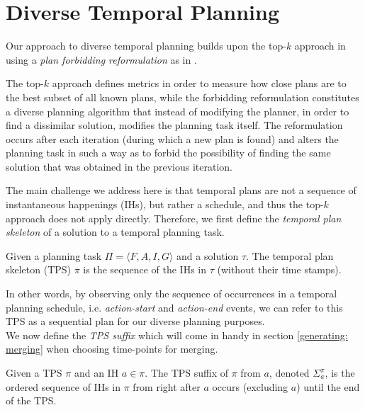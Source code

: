 \section{Diverse Temporal Planning}
\label{background: Diverse Temporal}

Our approach to diverse temporal planning builds upon the top-$k$ approach in \cite{katz2019reshaping} using a {\em plan forbidding reformulation} as in \cite{katz2018novel} . 

The top-$k$ approach defines metrics in order to measure how close plans are to the best subset of all known plans, while the forbidding reformulation constitutes a diverse planning algorithm that instead of modifying the planner, in order to find a dissimilar solution, modifies the planning task itself. The reformulation occurs after each iteration (during which a new plan is found) and alters the planning task in such a way as to forbid the possibility of finding the same solution that was obtained in the previous iteration.

The main challenge we address here is that temporal plans are not a sequence of instantaneous happenings (IHs), but rather a schedule, and thus the top-$k$ approach does not apply directly. Therefore, we first define the {\em temporal plan skeleton} of a solution to a temporal planning task.

\begin{definition}
Given a planning task $\Pi = \langle F,A,I,G \rangle$ and a solution $\tau$. 
The temporal plan skeleton (TPS) $\pi$ is the sequence of the IHs in $\tau$ (without their time stamps).
\end{definition}

In other words, by observing only the sequence of occurrences in a temporal planning schedule, i.e. \textit{action-start} and \textit{action-end} events, we can refer to this TPS as a sequential plan for our diverse planning purposes. \\
We now define the \textit{TPS suffix} which will come in handy in section \ref{generating: merging} when choosing time-points for merging.

\begin{definition}
Given a TPS $\pi$ and an IH $a \in \pi$. The TPS suffix of $\pi$ from $a$, denoted $\Sigma^\pi_a$, is the ordered sequence of IHs in $\pi$ from right after $a$ occurs (excluding $a$) until the end of the TPS.
\end{definition}


